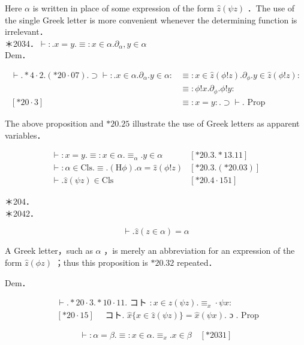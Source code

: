 \documentclass[10pt]{article}
\begin{document}
Here $\alpha$ is written in place of some expression of the form $\hat{z}(\psi z)$ ．The use of the single Greek letter is more convenient whenever the determining function is irrelevant．\\
＊2034．$\vdash: . x=y . \equiv: x \in \alpha . \partial_{\alpha}, y \in \alpha$\\
Dem．

$$
\begin{aligned}
\vdash . * 4 \cdot 2 .(* 20 \cdot 07) . \supset \vdash: . x \in \alpha . \partial_{\alpha} . y \in \alpha: & \equiv: x \in \hat{z}(\phi!z) . \partial_{\phi} . y \in \hat{z}(\phi!z): \\
& \equiv: \phi!x . \partial_{\phi} . \phi!y: \\
{[* 20 \cdot 3] } & \equiv: x=y: . \supset \vdash . \text { Prop }
\end{aligned}
$$

The above proposition and $* 20.25$ illustrate the use of Greek letters as apparent variables．

\[
\begin{array}{ll}
\vdash: x=y . \equiv: x \in \alpha . \equiv_{\alpha} . y \in \alpha & {[* 20.3 . * 13.11]}  \tag{*2035.}\\
\vdash: \alpha \in \mathrm{Cls} . \equiv .(\mathrm{H} \phi) . \alpha=\widehat{z}(\phi!z) & {[* 20.3 .(* 20.03)]} \\
\vdash . \hat{z}(\psi z) \in \mathrm{Cls} & {[* 20.4 \cdot 151]}
\end{array}
\]

＊204．\\
＊2042．

$$
\vdash . \hat{z}(z \in \alpha)=\alpha
$$

A Greek letter，such as $\alpha$ ，is merely an abbreviation for an expression of the form $\hat{z}(\phi z)$ ；thus this proposition is $* 20.32$ repeated．

Dem．

$$
\begin{aligned}
& \vdash . * 20 \cdot 3 . * 10 \cdot 11 . \text { コト }: x \in \hat{z}(\psi z) . \equiv_{x} \cdot \psi x: \\
& {[* 20 \cdot 15] \quad \text { コト. } \hat{x}\{x \in \hat{z}(\psi z)\}=\hat{x}(\psi x) . \text { ɔ } . \text { Prop }}
\end{aligned}
$$


\begin{equation*}
\vdash: \alpha=\beta . \equiv: x \in \alpha . \equiv_{x} . x \in \beta \quad[* 2031] \tag{$* 2043$.}
\end{equation*}
\end{document}
